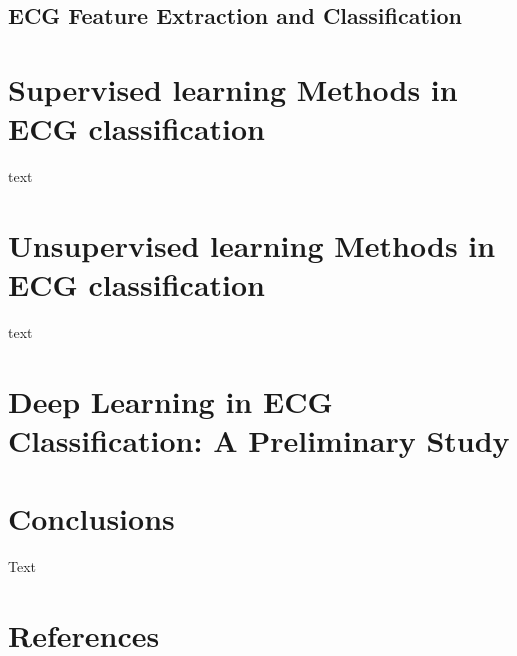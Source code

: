 \documentclass{bmcart}
\begin{document}
\subsection*{ECG Feature Extraction and Classification}



\section*{Supervised learning Methods in ECG classification}
text


\section*{Unsupervised learning Methods in ECG classification}
text


\section*{Deep Learning in ECG Classification: A Preliminary Study}




\section*{Conclusions}
Text

\section*{References}
\end{document}
